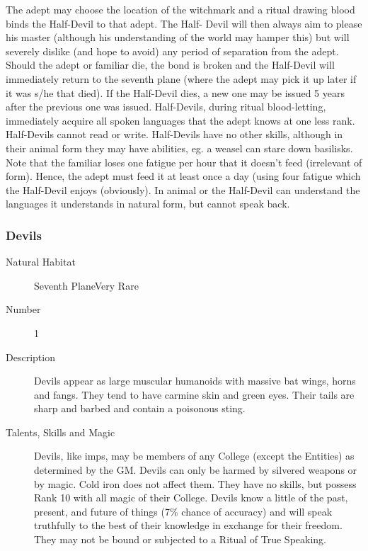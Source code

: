 \begin{multicols*}{2}
\begin{description}
The adept may choose the location of the witchmark and a ritual
drawing blood binds the Half-Devil to that adept.  The Half- Devil
will then always aim to please his master (although his understanding
of the world may hamper this) but will severely dislike (and hope to
avoid) any period of separation from the adept.  Should the adept or
familiar die, the bond is broken and the Half-Devil will immediately
return to the seventh plane (where the adept may pick it up later if
it was s/he that died).  If the Half-Devil dies, a new one may be
issued 5 years after the previous one was issued.  Half-Devils, during
ritual blood-letting, immediately acquire all spoken languages that
the adept knows at one less rank.  Half-Devils cannot read or write.
Half-Devils have no other skills, although in their animal form they
may have abilities, eg.  a weasel can stare down basilisks.  Note that
the familiar loses one fatigue per hour that it doesn't feed
(irrelevant of form).  Hence, the adept must feed it at least once a
day (using four fatigue which the Half-Devil enjoys (obviously).  In
animal or the Half-Devil can understand the languages it understands
in natural form, but cannot speak back.

\end{description}

\subsubsection{Devils}

\begin{description}
\item[Natural Habitat]Seventh PlaneVery Rare

\item[Number] 1

\item[Description]Devils appear as large muscular humanoids with
massive bat wings, horns and fangs.  They tend to have carmine skin
and green eyes.  Their tails are sharp and barbed and contain a
poisonous sting.

\item[Talents, Skills and Magic]Devils, like imps, may be members of any College (except the
Entities) as determined by the GM. Devils can only be harmed by
silvered weapons or by magic.  Cold iron does not affect them.  They
have no skills, but possess Rank 10 with all magic of their College.
Devils know a little of the past, present, and future of things
(7\% chance of accuracy) and will speak truthfully to the best of
their knowledge in exchange for their freedom.  They may not be bound
or subjected to a Ritual of True Speaking.


\end{description}
\end{multicols*}
